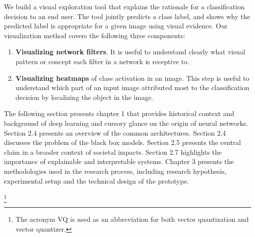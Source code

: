 We build a visual exploration tool that explains the rationale for a classification decision to an end user. The tool jointly predicts a class label,  and shows why the predicted label is appropriate for a given image using visual evidence. Our visualization method covers the following three components:

\begin{itemize}
\begin{enumerate}
\iffalse
\item  \textbf{Visualizing intermediate outputs}: It helps a user understands how successive layers transform their input, and to get an insight into the individual network filters. 
\fi

\item \textbf{Visualizing network filters}. It is useful to understand clearly what visual pattern or concept each filter in a network is receptive to. 

\item \textbf{Visualizing heatmaps} of class activation in an image. This step is useful to understand which part of an input image attributed most to the classification decision by localizing the object in the image.
\end{enumerate}
\end{itemize}

The following section presents chapter 1 that provides historical context and background of deep learning and cursory glance on the origin of neural networks.  Section 2.4 presents an overview of the common architectures.  Section 2.4 discusses the problem of the black box models.  Section 2.5 presents the central claim in a broader context of societal impacts.  Section 2.7 highlights the importance of explainable and interpretable systems.  Chapter 3 presents the methodologies used in the research process, including research hypothesis, experimental setup and the technical design of the prototype.

\footnote{The acronym VQ is used as an abbreviation for both vector quantization and vector
  quantizer.}
  



